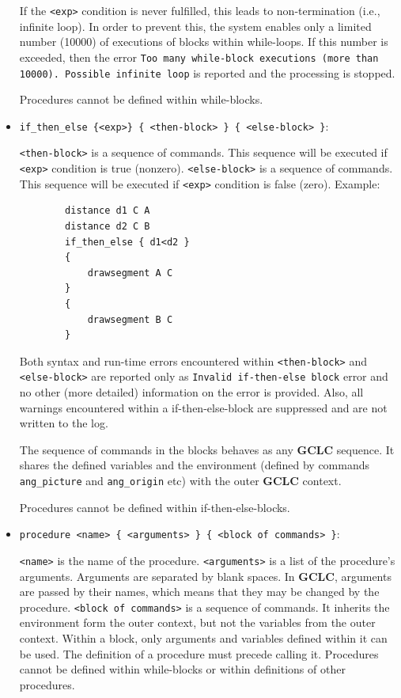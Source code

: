 \documentclass[a4paper]{book}
\newcommand{\gclc}{{\bfseries GCLC}\xspace}
\begin{document}
\begin{itemize}
        If the \verb|<exp>| condition is never fulfilled, this leads to non-termination
        (i.e., infinite loop). In order to prevent this, the system enables only a limited
        number (10000) of executions of blocks within while-loops. If this number is exceeded,
        then the error {\tt Too many while-block executions (more than 10000). Possible infinite loop}
        is reported and the processing is stopped.

        Procedures cannot be defined within while-blocks.

\item \verb|if_then_else {<exp>} { <then-block> } { <else-block> }|:

        \verb|<then-block>| is a sequence of commands. This sequence will be
        executed if \verb|<exp>| condition is true (nonzero).
        \verb|<else-block>| is a sequence of commands. This sequence will be
        executed if \verb|<exp>| condition is false (zero).
        Example:

        \begin{verbatim}
        distance d1 C A
        distance d2 C B
        if_then_else { d1<d2 }
        {
            drawsegment A C
        }
        {
            drawsegment B C
        }

        \end{verbatim}

        Both syntax and run-time errors encountered within \verb|<then-block>| and
        \verb|<else-block>| are reported only as \verb|Invalid if-then-else block|
        error and no other (more detailed) information on the error is provided.
        Also, all warnings encountered within a if-then-else-block are suppressed
        and are not written to the log.

        The sequence of commands in the blocks behaves as any \gclc sequence. It
        shares the defined variables and the environment (defined by commands
        \verb|ang_picture| and \verb|ang_origin| etc) with the outer \gclc context.

        Procedures cannot be defined within if-then-else-blocks.


\item \verb|procedure <name> { <arguments> } { <block of commands> }|:

        \verb|<name>| is the name of the procedure. \verb|<arguments>| is
        a list of the procedure's arguments. Arguments are separated by
        blank spaces. In \gclc, arguments are passed by their names, which
        means that they may be changed by the procedure. \verb|<block of commands>|
        is a sequence of commands. It inherits the environment form the outer
        context, but not the variables from the outer context. Within a
        block, only arguments and variables defined within it can be used.
        The definition of a procedure must precede calling it.
        Procedures cannot be defined within while-blocks or within
        definitions of other procedures.


\end{itemize}
\end{document}
